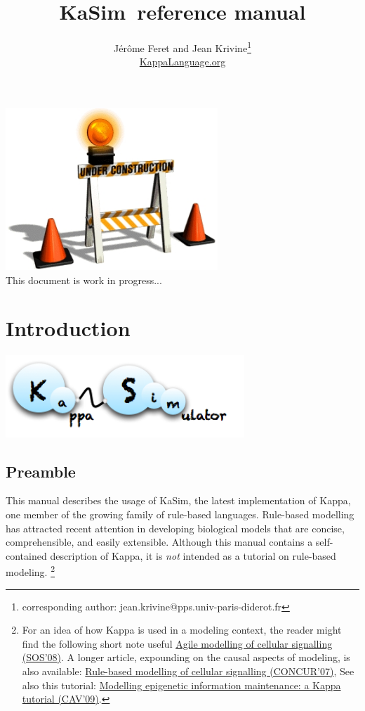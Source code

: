 \documentclass[11pt]{book}
\title{KaSim\version~reference manual}
\author{J\'er\^ome Feret and Jean Krivine\thanks{corresponding author: jean.krivine@pps.univ-paris-diderot.fr} \\\url{KappaLanguage.org}}
\def\KaSim{\textsf{KaSim}}
\begin{document}
\maketitle

\begin{center}\includegraphics[width=80mm]{img/wip.jpg}
\vspace{3cm}
\\This document is work in progress...
\end{center}

\tableofcontents
\listoftables

\chapter{Introduction}
\begin{center}\includegraphics[width=9cm]{img/KaSim-logo.png}\end{center}

\section{Preamble}
This manual describes the usage of \KaSim, the latest implementation of Kappa, one member of the growing family of rule-based languages. Rule-based modelling has attracted recent attention in developing biological models that are concise, comprehensible, and easily extensible. 
Although this manual contains a self-contained description of Kappa, it is \emph{not} intended as a tutorial on rule-based modeling.%
%
\footnote{For an idea of how Kappa is used in a modeling context, the reader might find the following short note useful \href{http://www.pps.jussieu.fr/~danos/pdf/eov.pdf}{Agile modelling of cellular signalling (SOS'08)}. A longer article, expounding on the causal aspects of modeling, is also available: \href{http://www.pps.jussieu.fr/~danos/pdf/ka-fix.pdf}{Rule-based modelling of cellular signalling (CONCUR'07)}, See also this tutorial: \href{http://www.pps.jussieu.fr/~danos/pdf/mytdg.pdf}{Modelling epigenetic information maintenance: a Kappa tutorial (CAV'09)}. 
}%
\end{document}

